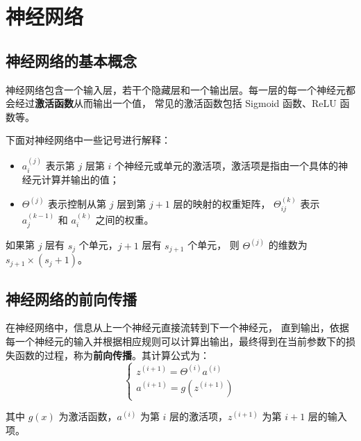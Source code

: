 \section{神经网络}
\subsection{神经网络的基本概念}
神经网络包含一个输入层，若干个隐藏层和一个输出层。每一层的每一个神经元都会经过\textbf{激活函数}从而输出一个值，
常见的激活函数包括 Sigmoid 函数、ReLU 函数等。

下面对神经网络中一些记号进行解释：
\begin{itemize}
    \item $a_i^{(j)}$ 表示第 $j$ 层第 $i$ 个神经元或单元的激活项，激活项是指由一个具体的神经元计算并输出的值；
    \item $\Theta^{(j)}$ 表示控制从第 $j$ 层到第 $j+1$ 层的映射的权重矩阵，
    $\Theta_{ij}^{(k)}$ 表示 $a_j^{(k-1)}$ 和 $a_i^{(k)}$ 之间的权重。
\end{itemize}

如果第 $j$ 层有 $s_j$ 个单元，$j+1$ 层有 $s_{j+1}$ 个单元，
则 $\Theta^{(j)}$ 的维数为 $s_{j+1} \times (s_j + 1)$。

\subsection{神经网络的前向传播}
在神经网络中，信息从上一个神经元直接流转到下一个神经元，
直到输出，依据每一个神经元的输入并根据相应规则可以计算出输出，最终得到在当前参数下的损失函数的过程，称为\textbf{前向传播}。其计算公式为：
\begin{equation}
    \begin{cases}z^{(i+1)} = \Theta^{(i)}a^{(i)} \\ a^{(i+1)} = g\left(z^{(i+1)}\right)\end{cases}
\end{equation}
    
其中 $g(x)$ 为激活函数，$a^{(i)}$ 为第 $i$ 层的激活项，$z^{(i+1)}$ 为第 $i+1$ 层的输入项。

